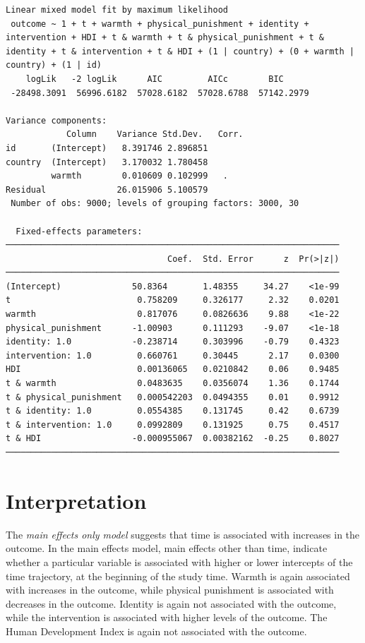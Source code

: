 \documentclass[
  letterpaper,
  DIV=11,
  numbers=noendperiod]{scrreprt}
\begin{document}
\begin{verbatim}
Linear mixed model fit by maximum likelihood
 outcome ~ 1 + t + warmth + physical_punishment + identity + intervention + HDI + t & warmth + t & physical_punishment + t & identity + t & intervention + t & HDI + (1 | country) + (0 + warmth | country) + (1 | id)
    logLik   -2 logLik      AIC         AICc        BIC     
 -28498.3091  56996.6182  57028.6182  57028.6788  57142.2979

Variance components:
            Column    Variance Std.Dev.   Corr.
id       (Intercept)   8.391746 2.896851
country  (Intercept)   3.170032 1.780458
         warmth        0.010609 0.102999   .  
Residual              26.015906 5.100579
 Number of obs: 9000; levels of grouping factors: 3000, 30

  Fixed-effects parameters:
──────────────────────────────────────────────────────────────────
                                Coef.  Std. Error      z  Pr(>|z|)
──────────────────────────────────────────────────────────────────
(Intercept)              50.8364       1.48355     34.27    <1e-99
t                         0.758209     0.326177     2.32    0.0201
warmth                    0.817076     0.0826636    9.88    <1e-22
physical_punishment      -1.00903      0.111293    -9.07    <1e-18
identity: 1.0            -0.238714     0.303996    -0.79    0.4323
intervention: 1.0         0.660761     0.30445      2.17    0.0300
HDI                       0.00136065   0.0210842    0.06    0.9485
t & warmth                0.0483635    0.0356074    1.36    0.1744
t & physical_punishment   0.000542203  0.0494355    0.01    0.9912
t & identity: 1.0         0.0554385    0.131745     0.42    0.6739
t & intervention: 1.0     0.0992809    0.131925     0.75    0.4517
t & HDI                  -0.000955067  0.00382162  -0.25    0.8027
──────────────────────────────────────────────────────────────────
\end{verbatim}

\section{Interpretation}\label{interpretation-4}

The \emph{main effects only model} suggests that time is associated with
increases in the outcome. In the main effects model, main effects other
than time, indicate whether a particular variable is associated with
higher or lower intercepts of the time trajectory, at the beginning of
the study time. Warmth is again associated with increases in the
outcome, while physical punishment is associated with decreases in the
outcome. Identity is again not associated with the outcome, while the
intervention is associated with higher levels of the outcome. The Human
Development Index is again not associated with the outcome.
\end{document}
